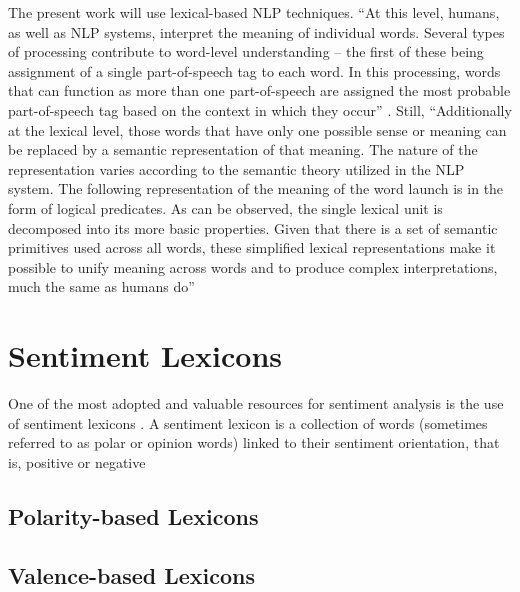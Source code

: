 The present work will use lexical-based NLP techniques. ``At this level, humans, as well as NLP systems, interpret the meaning of individual words. Several types of processing contribute to word-level understanding – the first of these being assignment of a single part-of-speech tag to each word. In this processing, words that can function as more than one part-of-speech are assigned the most probable part-of-speech tag based on the context in which they occur'' \cite[p.7]{liddy2001natural}. Still, ``Additionally at the lexical level, those words that have only one possible sense or meaning can be replaced by a semantic representation of that meaning. The nature of the representation varies according to the semantic theory utilized in the NLP system. The following representation of the meaning of the word launch is in the form of logical predicates. As can be observed, the single lexical unit is decomposed into its more basic properties. Given that there is a set of semantic primitives used across all words, these simplified lexical representations make it possible to unify meaning across words and to produce complex interpretations, much the same as humans do'' \cite[p.7]{liddy2001natural}\\



\section{Sentiment Lexicons} \label{sec:lexicons}
One of the most adopted and valuable resources for sentiment analysis is the use of sentiment lexicons \cite[]{ahire2014survey, nusko2016building, cambria2013new, kaity2020sentiment}. A sentiment lexicon is a collection of words (sometimes referred to as polar or opinion words) linked to their sentiment orientation, that is, positive or negative \cite{kaity2020sentiment, medhat2014sentiment}


\subsection{Polarity-based Lexicons} \label{subsec:polbas}
\subsection{Valence-based Lexicons}



